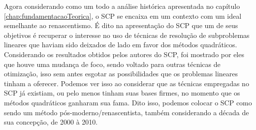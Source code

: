 Agora considerando como um todo a análise histórica apresentada no capítulo
\ref{chap:fundamentacaoTeorica}, o SCP se encaixa em um contexto com um ideal
semelhante ao renascentismo. É dito na apresentação do SCP que um de seus objetivos
é recuperar o interesse no uso de técnicas de resolução de subproblemas lineares
que haviam sido deixados de lado em favor dos métodos quadráticos. Considerando
os resultados obtidos pelos autores do SCP, foi mostrado por eles que houve
uma mudança de foco, sendo voltado para outras técnicas de otimização, isso sem
antes esgotar as possibilidades que os problemas lineares tinham a oferecer.
Podemos ver isso ao considerar que as técnicas empregadas no SCP já existiam,
ou pelo menos tinham suas bases firmes, no momento que os métodos quadráticos
ganharam sua fama. Dito isso, podemos colocar o SCP como sendo um método
pós-moderno/renascentista, também considerando a década de sua concepção, de
2000 à 2010.
